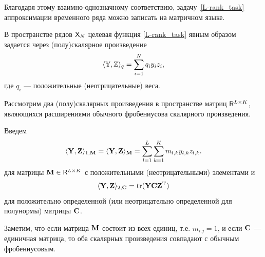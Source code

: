 \documentclass[12pt, specialist, subf,href,colorlinks=true,substylefile = spbu.rtx]{disser}
\DeclareMathOperator{\tr}{tr}
\theoremstyle{remark}
\theoremstyle{definition}
\begin{document}
Благодаря этому взаимно-однозначному соответствию,
задачу~\eqref{L-rank_task} аппроксимации временного ряда можно записать на матричном языке.

В пространстве рядов $\mathsf{X}_N$ целевая функция \eqref{L-rank_task} явным образом задается через (полу)скалярное произведение
\begin{equation}
\label{eq:norm_ser}
    \langle\mathbb{Y},\mathbb{Z}\rangle_q = \sum_{i = 1}^N q_i y_i z_i,
\end{equation}
где $q_i$ --- положительные (неотрицательные) веса.

Рассмотрим два (полу)скалярных произведения в пространстве матриц  $\mathsf{R}^{L \times K}$, являющихся расширениями
обычного фробениусова скалярного произведения.

Введем
\begin{equation}
\label{eq:norm1M}
\langle\mathbf{Y},\mathbf{Z}\rangle_{1,\mathbf{M}} = \langle\mathbf{Y},\mathbf{Z}\rangle_{\mathbf{M}} = \sum_{l = 1}^L \sum_{k=1}^K m_{l,k} y_{l,k} z_{l,k}.
\end{equation}
для матрицы $\mathbf{M} \in \mathsf{R}^{L \times K}$ с положительными (неотрицательными) элементами и
\begin{equation}
\label{eq:norm2S}
\langle\bfY,\bfZ\rangle_{2,\bfC} = \tr(\bfY \bfC \bfZ^\rmT)
\end{equation}
для положительно определенной (или неотрицательно определенной для полунормы) матрицы $\mathbf{C}$.

Заметим, что если матрица $\mathbf{M}$ состоит из всех единиц, т.е. $m_{i.j}=1$,
и если $\mathbf{C}$ --- единичная матрица, то оба скалярных произведения совпадают
с обычным фробениусовым.
\end{document}
